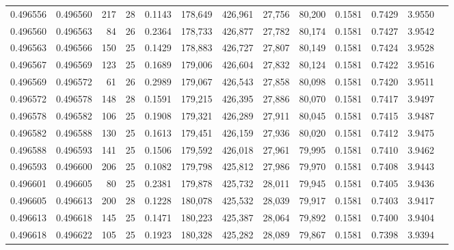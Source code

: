 \begin{tabular}{rrrrrrrrrrrrr}
0.496556 & 0.496560 & 217 &  28 &                                     0.1143 & 178,649 & 426,961 &  27,756 &  80,200 & 0.1581 & 0.7429 & 3.9550 \\
0.496560 & 0.496563 &  84 &  26 &                                     0.2364 & 178,733 & 426,877 &  27,782 &  80,174 & 0.1581 & 0.7427 & 3.9542 \\
0.496563 & 0.496566 & 150 &  25 &                                     0.1429 & 178,883 & 426,727 &  27,807 &  80,149 & 0.1581 & 0.7424 & 3.9528 \\
0.496567 & 0.496569 & 123 &  25 &                                     0.1689 & 179,006 & 426,604 &  27,832 &  80,124 & 0.1581 & 0.7422 & 3.9516 \\
0.496569 & 0.496572 &  61 &  26 &                                     0.2989 & 179,067 & 426,543 &  27,858 &  80,098 & 0.1581 & 0.7420 & 3.9511 \\
0.496572 & 0.496578 & 148 &  28 &                                     0.1591 & 179,215 & 426,395 &  27,886 &  80,070 & 0.1581 & 0.7417 & 3.9497 \\
0.496578 & 0.496582 & 106 &  25 &                                     0.1908 & 179,321 & 426,289 &  27,911 &  80,045 & 0.1581 & 0.7415 & 3.9487 \\
0.496582 & 0.496588 & 130 &  25 &                                     0.1613 & 179,451 & 426,159 &  27,936 &  80,020 & 0.1581 & 0.7412 & 3.9475 \\
0.496588 & 0.496593 & 141 &  25 &                                     0.1506 & 179,592 & 426,018 &  27,961 &  79,995 & 0.1581 & 0.7410 & 3.9462 \\
0.496593 & 0.496600 & 206 &  25 &                                     0.1082 & 179,798 & 425,812 &  27,986 &  79,970 & 0.1581 & 0.7408 & 3.9443 \\
0.496601 & 0.496605 &  80 &  25 &                                     0.2381 & 179,878 & 425,732 &  28,011 &  79,945 & 0.1581 & 0.7405 & 3.9436 \\
0.496605 & 0.496613 & 200 &  28 &                                     0.1228 & 180,078 & 425,532 &  28,039 &  79,917 & 0.1581 & 0.7403 & 3.9417 \\
0.496613 & 0.496618 & 145 &  25 &                                     0.1471 & 180,223 & 425,387 &  28,064 &  79,892 & 0.1581 & 0.7400 & 3.9404 \\
0.496618 & 0.496622 & 105 &  25 &                                     0.1923 & 180,328 & 425,282 &  28,089 &  79,867 & 0.1581 & 0.7398 & 3.9394 \\

\end{tabular}
